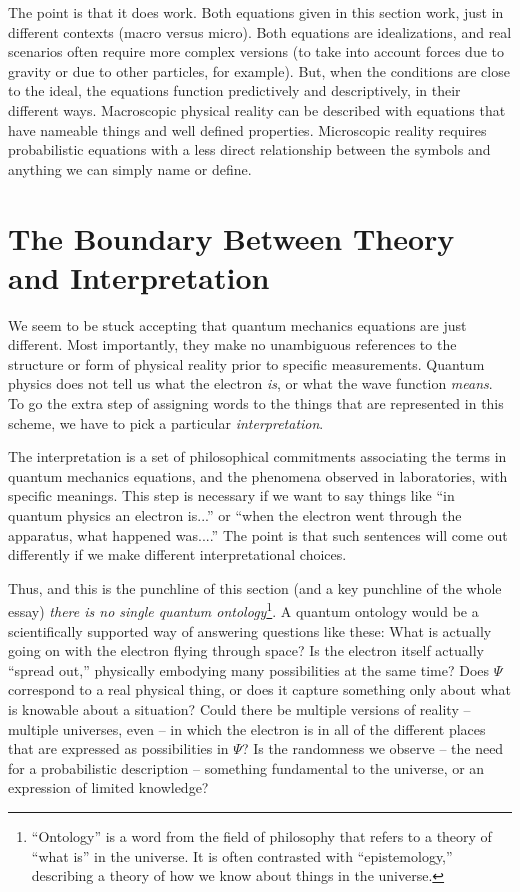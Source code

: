 \documentclass[12pt,onecolumn,preprintnumbers,amsmath,amssymbn,reprint,nofootinbib,superscriptaddress]{revtex4}    %
\begin{document}
The point is that it does work.  Both equations given in this section work, just in different contexts (macro versus micro).  Both equations are idealizations, and real scenarios often require more complex versions (to take into account forces due to gravity or due to other particles, for example).  But, when the conditions are close to the ideal, the equations function predictively and descriptively, in their different ways.  Macroscopic physical reality can be described with equations that have nameable things and well defined properties.  Microscopic reality requires probabilistic equations with a less direct relationship between the symbols and anything we can simply name or define.  

\section{The Boundary Between Theory and Interpretation} 

We seem to be stuck accepting that quantum mechanics equations are just different.  Most importantly, they make no unambiguous references to the structure or form of physical reality prior to specific measurements. Quantum physics does not tell us what the electron {\em is}, or what the wave function {\em means}.  To go the extra step of assigning words to the things that are represented in this scheme, we have to pick a particular {\em interpretation}. 

The interpretation is a set of philosophical commitments associating the terms in quantum mechanics equations, and the phenomena observed in laboratories, with specific meanings.  This step is necessary if we want to say things like ``in quantum physics an electron is...'' or ``when the electron went through the apparatus, what happened was....''  The point is that such sentences will come out differently if we make different interpretational choices.  

Thus, and this is the punchline of this section (and a key punchline of the whole essay) {\em there is no single quantum ontology}\footnote{``Ontology'' is a word from the field of philosophy that refers to a theory of ``what is'' in the universe.  It is often contrasted with ``epistemology,'' describing a theory of how we know about things in the universe.}. A quantum ontology would be a scientifically supported way of answering questions like these:  What is actually going on with the electron flying through space?  Is the electron itself actually ``spread out,'' physically embodying many possibilities at the same time? Does $\Psi$ correspond to a real physical thing, or does it capture something only about what is knowable about a situation?  Could there be multiple versions of reality -- multiple universes, even -- in which the electron is in all of the different places that are expressed as possibilities in $\Psi$?  Is the randomness we observe -- the need for a probabilistic description -- something fundamental to the universe, or an expression of limited knowledge?  
\end{document}
